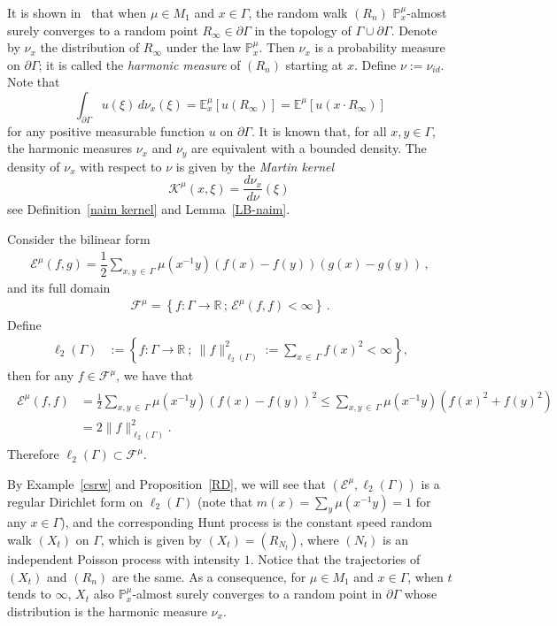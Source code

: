 \documentclass[AHL,Unicode,longabstracts,published]{cedram}
\newcommand{\ra}{\rightarrow}
\newcommand{\ce}{\mathcal{E}}
\newcommand{\cf}{\mathcal{F}}
\newcommand{\ck}{\mathcal{K}}
\newcommand{\bp}{\mathbb{P}}
\newcommand{\br}{\mathbb{R}}
\newcommand{\be}{\mathbb{E}}
\begin{document}
It is shown in~\cite{Ka} that when $\mu\in M_1$ and $x\in\Gamma$, the random walk $(R_n)$ $\bp^{\mu}_x$-almost surely converges to a random point $R_{\infty}\in\partial\Gamma$ in the topology of $\Gamma\cup\partial\Gamma$. Denote by $\nu_x$ the distribution of $R_{\infty}$ under the law $\bp^{\mu}_x$. Then $\nu_x$ is a probability measure on $\partial\Gamma$; it is called the \emph{harmonic measure} of $(R_n)$ starting at $x$. Define $\nu:=\nu_{id}$.
Note that
\[
\int_{\partial \Gamma} u(\xi)\, d\nu_x(\xi)= \be_x^\mu[u(R_\infty)]=\be^\mu[u(x\cdot R_\infty)]
\]
for any positive measurable function $u$ on $\partial \Gamma$.
It is known that, for all $x,y\in\Gamma$, the harmonic measures $\nu_x$ and $\nu_y$ are equivalent with a bounded density. The density of $\nu_x$ with respect to $\nu$ is given by the \emph{Martin kernel}
\[
\ck^\mu(x,\xi)=\frac{d\nu_x}{d\nu}(\xi)\,
\]
see Definition~\ref{naim kernel} and Lemma~\ref{LB-naim}.

Consider the bilinear form
\begin{align*}
\ce^\mu(f,g)=\dfrac{1}{2}\sum_{x,y\,\in\,\Gamma} \mu\left(x^{-1}y\right)(f(x)-f(y))(g(x)-g(y))\,,
\end{align*}
and its full domain
\begin{align*}
\cf^\mu=\left\{f:\Gamma\ra\br\,;\, \ce^\mu(f,f)<\infty\right\}\,.
\end{align*}
Define
\begin{align*}
\ell_2(\Gamma)&:=\left\{f:\Gamma\to\br\ ;\ \|f\|^2_{\ell_2(\Gamma)}:=\sum_{x\,\in\,\Gamma}f(x)^2<\infty\right\},
\end{align*}
then for any $f\in\cf^{\mu}$, we have that
\begin{align}\label{ele}
\begin{split}
\ce^{\mu}(f,f) &=\frac{1}{2}\sum_{x,y\,\in\,\Gamma}\mu\left(x^{-1}y\right)\left(f(x)-f(y)\right)^2
\leq\sum_{x,y\,\in\,\Gamma}\mu\left(x^{-1}y\right)\left(f(x)^2+f(y)^2\right)\\
&=2\|f\|_{\ell_2(\Gamma)}^2.
\end{split}
\end{align}
Therefore $\ell_2(\Gamma)\subset\cf^\mu$.

By Example~\ref{csrw} and Proposition~\ref{RD}, we will see that $(\ce^{\mu},\ell_2(\Gamma))$ is a regular Dirichlet form on $\ell_2(\Gamma)$ (note that $m(x)=\sum_y\mu(x^{-1}y)=1$ for any $x\in\Gamma$), and the corresponding Hunt process is the constant speed random walk $(X_t)$ on $\Gamma$, which is given by $(X_t)=(R_{N_t})$, where $(N_t)$ is an independent Poisson process with intensity $1$. Notice that the trajectories of $(X_t)$ and $(R_n)$ are the same. As a consequence, for $\mu\in M_1$ and $x\in\Gamma$, when $t$ tends to $\infty$, $X_t$ also $\bp^{\mu}_x$-almost surely converges to a random point in $\partial\Gamma$ whose distribution is the harmonic measure $\nu_x$.
\end{document}
